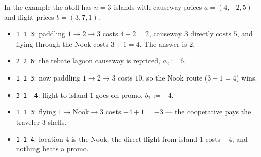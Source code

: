 In the example the atoll has $n = 3$ islands with causeway prices $a = (4, -2, 5)$ and flight prices $b = (3, 7, 1)$.

\begin{itemize}
\item \texttt{1 1 3}: paddling $1 \to 2 \to 3$ costs $4 - 2 = 2$, causeway $3$ directly costs $5$, and flying through the Nook costs $3 + 1 = 4$. The answer is $2$.
\item \texttt{2 2 6}: the rebate lagoon causeway is repriced, $a_2 := 6$.
\item \texttt{1 1 3}: now paddling $1 \to 2 \to 3$ costs $10$, so the Nook route ($3 + 1 = 4$) wins.
\item \texttt{3 1 -4}: flight to island $1$ goes on promo, $b_1 := -4$.
\item \texttt{1 1 3}: flying $1 \to \text{Nook} \to 3$ costs $-4 + 1 = -3$ --- the cooperative pays the traveler $3$ shells.
\item \texttt{1 1 4}: location $4$ is the Nook; the direct flight from island $1$ costs $-4$, and nothing beats a promo.
\end{itemize}
